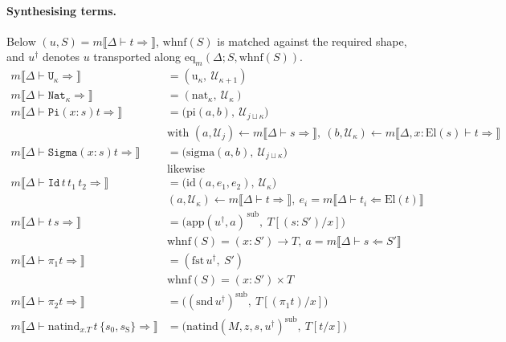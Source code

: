 \paragraph{Synthesising terms.} Below $(u,S)=m\llbracket\Delta\vdash t\Rightarrow\rrbracket$, $\mathrm{whnf}(S)$ is matched against the required shape, and $u^{\dagger}$ denotes $u$ transported along $\mathrm{eq}_m(\Delta;S,\mathrm{whnf}(S))$.
\begin{align*}
m\llbracket\Delta\vdash \mathtt U_\kappa\Rightarrow\rrbracket &= (\mathrm u_\kappa,\ \mathcal U_{\kappa+1}) \\
m\llbracket\Delta\vdash \mathtt{Nat}_\kappa\Rightarrow\rrbracket &= (\mathrm{nat}_\kappa,\ \mathcal U_\kappa)\\
m\llbracket\Delta\vdash \mathtt{Pi}(x:s)t\Rightarrow\rrbracket &= \big(\mathrm{pi}(a, b),\ \mathcal U_{j\sqcup\kappa}\big)\\
 &\text{with } (a,\mathcal U_j) \leftarrow m\llbracket\Delta\vdash s\Rightarrow\rrbracket,\ (b,\mathcal U_\kappa) \leftarrow m\llbracket\Delta,x:\mathrm{El}(s)\vdash t\Rightarrow\rrbracket\\
m\llbracket\Delta\vdash \mathtt{Sigma}(x:s)t\Rightarrow\rrbracket &= \big(\mathrm{sigma}(a,b),\ \mathcal U_{j\sqcup\kappa}\big) \\ &\text{likewise}\\
m\llbracket\Delta\vdash \mathtt{Id}\,t\,t_1\,t_2\Rightarrow\rrbracket &= \big(\mathrm{id}(a, e_1, e_2),\ \mathcal U_\kappa\big)\\
&(a,\mathcal U_\kappa) \leftarrow m\llbracket\Delta\vdash t\Rightarrow\rrbracket,\ e_i = m\llbracket\Delta\vdash t_i\Leftarrow\mathrm{El}(t)\rrbracket\\
m\llbracket\Delta\vdash t\,s\Rightarrow\rrbracket &= \big(\mathrm{app}(u^\dagger, a)^{\,\mathrm{sub}},\ T[(s:S')/x]\big)
 \\ &\mathrm{whnf}(S)=(x:S')\to T,\ a=m\llbracket\Delta\vdash s\Leftarrow S'\rrbracket\\
m\llbracket\Delta\vdash \pi_1 t\Rightarrow\rrbracket &= (\mathrm{fst}\,u^\dagger,\ S') \\ &\mathrm{whnf}(S)=(x:S')\times T\\
m\llbracket\Delta\vdash \pi_2 t\Rightarrow\rrbracket &= \big((\mathrm{snd}\,u^\dagger)^{\mathrm{sub}},\ T[(\pi_1 t)/x]\big)\\
m\llbracket\Delta\vdash \mathrm{natind}_{x.T}\,t\,\{s_0,s_{\mathrm S}\}\Rightarrow\rrbracket &=
 \big(\mathrm{natind}(M, z, s, u^\dagger)^{\mathrm{sub}},\ T[t/x]\big)\\

\end{align*}
